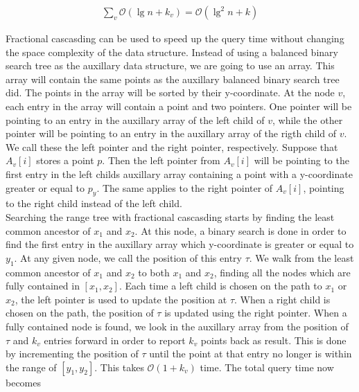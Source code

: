 \begin{align*}
  \sum\limits_{v} \mathcal{O}(\lg n + k_v) = \mathcal{O}(\lg^2 n + k)
\end{align*}

Fractional cascasding can be used to speed up the query time without changing the space complexity of the data structure. Instead of using a balanced binary search tree as the auxillary data structure, we are going to use an array. This array will contain the same points as the auxillary balanced binary search tree did. The points in the array will be sorted by their y-coordinate. At the node $v$, each entry in the array will contain a point and two pointers. One pointer will be pointing to an entry in the auxillary array of the left child of $v$, while the other pointer will be pointing to an entry in the auxillary array of the rigth child of $v$. We call these the left pointer and the right pointer, respectively. Suppose that $A_v[i]$ stores a point $p$. Then the left pointer from $A_v[i]$ will be pointing to the first entry in the left childs auxillary array containing a point with a y-coordinate greater or equal to $p_y$. The same applies to the right pointer of $A_v[i]$, pointing to the right child instead of the left child. \\

Searching the range tree with fractional cascasding starts by finding the least common ancestor of $x_1$ and $x_2$. At this node, a binary search is done in order to find the first entry in the auxillary array which y-coordinate is greater or equal to $y_1$. At any given node, we call the position of this entry $\tau$. We walk from the least common ancestor of $x_1$ and $x_2$ to both $x_1$ and $x_2$, finding all the nodes which are fully contained in $[x_1, x_2]$. Each time a left child is chosen on the path to $x_1$ or $x_2$, the left pointer is used to update the position at $\tau$. When a right child is chosen on the path, the position of $\tau$ is updated using the right pointer. When a fully contained node is found, we look in the auxillary array from the position of $\tau$ and $k_v$ entries forward in order to report $k_v$ points back as result. This is done by incrementing the position of $\tau$ until the point at that entry no longer is within the range of $[y_1, y_2]$. This takes $\mathcal{O}(1+k_v)$ time. The total query time now becomes


